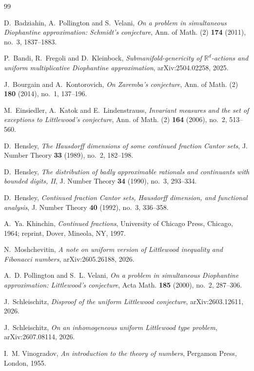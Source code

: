 \documentclass[11pt]{amsart}
\newcommand{\R}{\mathbb R}
\begin{document}
\begin{thebibliography}{99}

D.~Badziahin, A.~Pollington and S.~Velani,
\emph{On a problem in simultaneous Diophantine approximation:
Schmidt's conjecture},
Ann. of Math. (2) \textbf{174} (2011), no.~3, 1837--1883.

P.~Bandi, R.~Fregoli and D.~Kleinbock,
\emph{Submanifold-genericity of $\R^d$-actions and uniform multiplicative
Diophantine approximation},
arXiv:2504.02258, 2025.

J.~Bourgain and A.~Kontorovich,
\emph{On Zaremba's conjecture},
Ann. of Math. (2) \textbf{180} (2014), no.~1, 137--196.

M.~Einsiedler, A.~Katok and E.~Lindenstrauss,
\emph{Invariant measures and the set of exceptions to Littlewood's conjecture},
Ann. of Math. (2) \textbf{164} (2006), no.~2, 513--560.

D.~Hensley,
\emph{The Hausdorff dimensions of some continued fraction Cantor sets},
J. Number Theory \textbf{33} (1989), no.~2, 182--198.

D.~Hensley,
\emph{The distribution of badly approximable rationals and continuants with bounded digits, II},
J. Number Theory \textbf{34} (1990), no.~3, 293--334.

D.~Hensley,
\emph{Continued fraction Cantor sets, Hausdorff dimension, and functional analysis},
J. Number Theory \textbf{40} (1992), no.~3, 336--358.

A.~Ya. Khinchin,
\emph{Continued fractions},
University of Chicago Press, Chicago, 1964; reprint, Dover, Mineola, NY, 1997.

N.~Moshchevitin,
\emph{A note on uniform version of Littlewood inequality and Fibonacci numbers},
arXiv:2605.26188, 2026.

A.~D. Pollington and S.~L. Velani,
\emph{On a problem in simultaneous Diophantine approximation:
Littlewood's conjecture},
Acta Math. \textbf{185} (2000), no.~2, 287--306.

J.~Schleischitz,
\emph{Disproof of the uniform Littlewood conjecture},
arXiv:2603.12611, 2026.

J.~Schleischitz,
\emph{On an inhomogeneous uniform Littlewood type problem},
arXiv:2607.08114, 2026.



I.~M. Vinogradov,
\emph{An introduction to the theory of numbers},
Pergamon Press, London, 1955.

\end{thebibliography}
\end{document}
